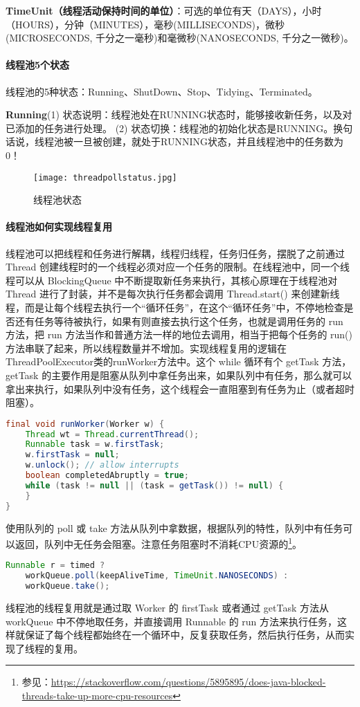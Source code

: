 \documentclass[../../../interview-questions.tex]{subfiles}
\begin{document}
\textbf{TimeUnit（线程活动保持时间的单位）}：可选的单位有天（DAYS），小时（HOURS），分钟（MINUTES），毫秒(MILLISECONDS)，微秒(MICROSECONDS, 千分之一毫秒)和毫微秒(NANOSECONDS, 千分之一微秒)。

\paragraph{线程池5个状态}

线程池的5种状态：Running、ShutDown、Stop、Tidying、Terminated。

\textbf{Running}(1) 状态说明：线程池处在RUNNING状态时，能够接收新任务，以及对已添加的任务进行处理。
(2) 状态切换：线程池的初始化状态是RUNNING。换句话说，线程池被一旦被创建，就处于RUNNING状态，并且线程池中的任务数为0！

\begin{figure}[htbp]
	\centering
	\texttt{[image: threadpollstatus.jpg]}
	\caption{线程池状态}
	\label{fig:threadpollstatus}
\end{figure}


\paragraph{线程池如何实现线程复用}

线程池可以把线程和任务进行解耦，线程归线程，任务归任务，摆脱了之前通过 Thread 创建线程时的一个线程必须对应一个任务的限制。在线程池中，同一个线程可以从 BlockingQueue 中不断提取新任务来执行，其核心原理在于线程池对 Thread 进行了封装，并不是每次执行任务都会调用 Thread.start() 来创建新线程，而是让每个线程去执行一个“循环任务”，在这个“循环任务”中，不停地检查是否还有任务等待被执行，如果有则直接去执行这个任务，也就是调用任务的 run 方法，把 run 方法当作和普通方法一样的地位去调用，相当于把每个任务的 run() 方法串联了起来，所以线程数量并不增加。实现线程复用的逻辑在ThreadPoolExecutor类的runWorker方法中。这个 while 循环有个 getTask 方法，getTask 的主要作用是阻塞从队列中拿任务出来，如果队列中有任务，那么就可以拿出来执行，如果队列中没有任务，这个线程会一直阻塞到有任务为止（或者超时阻塞）。

\begin{lstlisting}[language=Java]
final void runWorker(Worker w) {
    Thread wt = Thread.currentThread();
    Runnable task = w.firstTask;
    w.firstTask = null;
    w.unlock(); // allow interrupts
    boolean completedAbruptly = true;
    while (task != null || (task = getTask()) != null) {
    }
}
\end{lstlisting}

使用队列的 poll 或 take 方法从队列中拿数据，根据队列的特性，队列中有任务可以返回，队列中无任务会阻塞。注意任务阻塞时不消耗CPU资源的\footnote{参见：\url{https://stackoverflow.com/questions/5895895/does-java-blocked-threads-take-up-more-cpu-resources}}。

\begin{lstlisting}[language=Java]
Runnable r = timed ?
    workQueue.poll(keepAliveTime, TimeUnit.NANOSECONDS) :
    workQueue.take();
\end{lstlisting}
    

线程池的线程复用就是通过取 Worker 的 firstTask 或者通过 getTask 方法从 workQueue 中不停地取任务，并直接调用 Runnable 的 run 方法来执行任务，这样就保证了每个线程都始终在一个循环中，反复获取任务，然后执行任务，从而实现了线程的复用。
\end{document}
